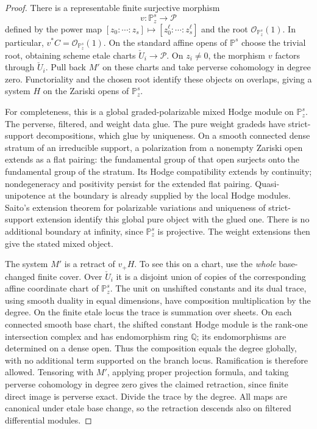\documentclass[11pt,letterpaper]{article}
\theoremstyle{definition}
\theoremstyle{remark}
\begin{document}
\begin{proof}
There is a representable finite surjective morphism
\[
 v:\mathbb{P}^s_z\longrightarrow\mathcal P
\]
defined by the power map
\([z_0:\cdots:z_s]\mapsto[z_0^\ell:\cdots:z_s^\ell]\)
and the root \(\mathcal{O}_{\mathbb{P}^s_z}(1)\).  In particular,
\(v^*C=\mathcal{O}_{\mathbb{P}^s_z}(1)\).  On the standard affine opens of \(\mathbb{P}^s\)
choose the trivial root, obtaining scheme etale charts
\(\check U_i\to\mathcal P\).  On \(z_i\ne0\), the morphism \(v\)
factors through \(\check U_i\).  Pull back \(M'\) on these charts
and take perverse cohomology in degree zero.  Functoriality and the
chosen root identify these objects on overlaps, giving a system
\(H\) on the Zariski opens of \(\mathbb{P}^s_z\).

For completeness, this is a global graded-polarizable mixed Hodge
module on \(\mathbb{P}^s_z\).  The perverse, filtered, and weight data glue.
The pure weight gradeds have strict-support decompositions, which
glue by uniqueness.  On a smooth connected dense stratum of an
irreducible support, a polarization from a nonempty Zariski open
extends as a flat pairing: the fundamental group of that open
surjects onto the fundamental group of the stratum.  Its Hodge
compatibility extends by continuity; nondegeneracy and positivity
persist for the extended flat pairing.  Quasi-unipotence at the
boundary is already supplied by the local Hodge modules.  Saito's
extension theorem for polarizable variations
\cite[Section~3.b]{Proj-Saito1990} and uniqueness of strict-support
extension identify this global pure object with the glued one.
There is no additional boundary at infinity, since \(\mathbb{P}^s_z\) is
projective.  The weight extensions then give the stated mixed
object.

The system \(M'\) is a retract of \(v_+H\).  To see this on a chart,
use the \emph{whole} base-changed finite cover.  Over \(\check U_i\)
it is a disjoint union of copies of the corresponding affine
coordinate chart of \(\mathbb{P}^s_z\).  The unit on unshifted constants
and its dual trace, using smooth duality in equal dimensions, have
composition multiplication by the degree.  On the finite etale
locus the trace is summation over sheets.  On each connected
smooth base chart, the shifted constant Hodge module is the
rank-one intersection complex and has endomorphism ring \(\mathbb{Q}\);
its endomorphisms are determined on a dense open.  Thus the
composition equals the degree globally, with no additional term
supported on the branch locus.  Ramification is therefore
allowed.  Tensoring with \(M'\), applying proper
projection formula, and taking perverse cohomology in degree zero
gives the claimed retraction, since finite direct image is
perverse exact.  Divide the trace by the degree.  All maps are
canonical under etale base change, so the retraction descends also
on filtered differential modules.


\end{proof}
\end{document}
